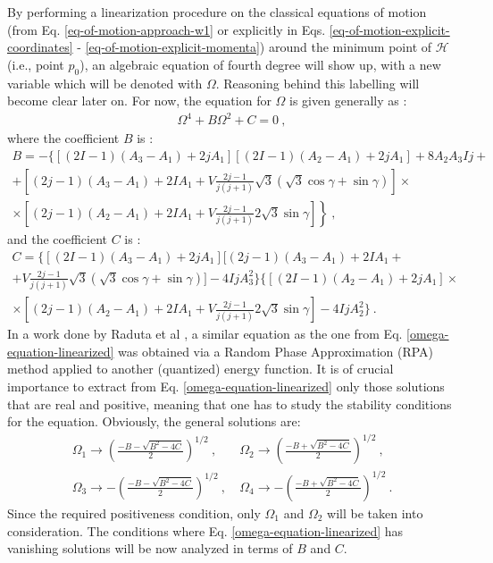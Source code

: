 By performing a linearization procedure on the classical equations of motion (from Eq. \ref{eq-of-motion-approach-w1} or explicitly in Eqs. \ref{eq-of-motion-explicit-coordinates} - \ref{eq-of-motion-explicit-momenta}) around the minimum point of $\mathcal{H}$ (i.e., point $p_0$), an algebraic equation of fourth degree will show up, with a new variable which will be denoted with $\Omega$. Reasoning behind this labelling will become clear later on. For now, the equation for $\Omega$ is given generally as \cite{raduta2020towards}:
\begin{align}
    \Omega^4+B\Omega^2+C=0\ ,
    \label{omega-equation-linearized}
\end{align}
where the coefficient $B$ is \cite{raduta2020approach}:
\begin{multline}
    B=-\bigg\{\left[ (2I-1)(A_3-A_1)+2jA_1\right]\left[(2I-1)(A_2-A_1)+2jA_1\right]+8A_2A_3Ij+\\
    +\left[(2j-1)(A_3-A_1)+2IA_1+V\frac{2j-1}{j(j+1)}\sqrt{3}\left(\sqrt{3}\cos\gamma+\sin\gamma\right)\right]\times\\
    \left.\times\left[(2j-1)(A_2-A_1)+2IA_1+V\frac{2j-1}{j(j+1)}2\sqrt{3}\sin\gamma\right]\right\}\ ,
    \label{omega-B-term}
\end{multline}
and the coefficient $C$ is \cite{raduta2020approach}:
\begin{multline}
    C=\bigg\{\left[(2I-1)(A_3-A_1)+2jA_1\right]\bigg[(2j-1)(A_3-A_1)+2IA_1+\\
    +V\frac{2j-1}{j(j+1)}\sqrt{3}(\sqrt{3}\cos\gamma+\sin\gamma)\bigg]-4IjA_3^2\bigg\}\bigg\{\left[(2I-1)(A_2-A_1)+2jA_1\right]\times\\
    \times\left[(2j-1)(A_2-A_1)+2IA_1+V\frac{2j-1}{j(j+1)}2\sqrt{3}\sin\gamma\right]-4IjA_2^2\bigg\}\ .
    \label{omega-C-term}
\end{multline}
In a work done by Raduta et al \cite{raduta2017semiclassical}, a similar equation as the one from Eq. \ref{omega-equation-linearized} was obtained via a Random Phase Approximation (RPA) method applied to another (quantized) energy function. It is of crucial importance to extract from Eq. \ref{omega-equation-linearized} only those solutions that are real and positive, meaning that one has to study the stability conditions for the equation. Obviously, the general solutions are:
\begin{align}
    \Omega_1 \to \left(\frac{-B-\sqrt{B^2-4 C}}{2}\right)^{1/2}\ ,&\ \Omega_2 \to \left(\frac{-B+\sqrt{B^2-4 C}}{2}\right)^{1/2}\ ,\nonumber\\
    \Omega_3 \to -\left(\frac{-B-\sqrt{B^2-4 C}}{2}\right)^{1/2}\ ,&\ \Omega_4 \to -\left(\frac{-B+\sqrt{B^2-4 C}}{2}\right)^{1/2}\ .
    \label{omega-1-2-3-4-solutions}
\end{align}
Since the required positiveness condition, only $\Omega_1$ and $\Omega_2$ will be taken into consideration. The conditions where Eq. \ref{omega-equation-linearized} has vanishing solutions will be now analyzed in terms of $B$ and $C$.

